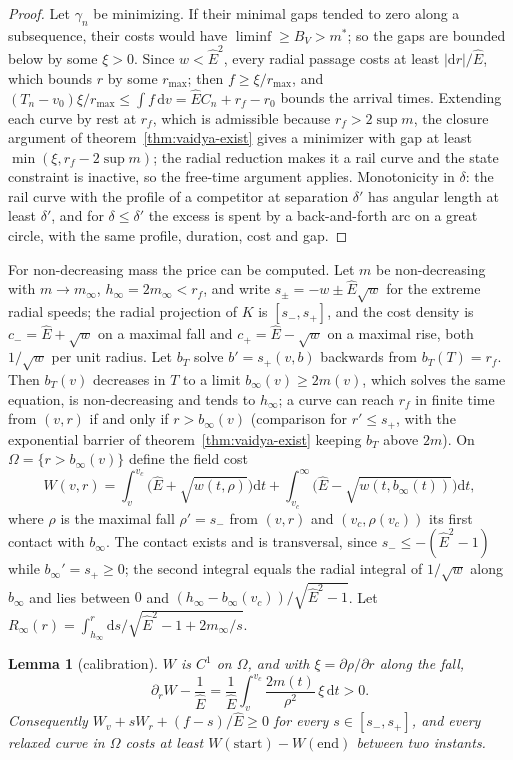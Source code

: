 \documentclass[aip,jmp,amsmath,amssymb,reprint]{revtex4-2}
\newcommand{\Ehat}{\hat E}
\newcommand{\dd}{\mathrm{d}}
\theoremstyle{plain}
\newtheorem{lemma}[proposition]{Lemma}
\theoremstyle{definition}
\begin{document}
\begin{proof}
Let $\gamma_n$ be minimizing. If their minimal gaps tended to zero along a subsequence, their
costs would have $\liminf\ge B_V>m^*$; so the gaps are bounded below by some $\xi>0$. Since
$w<\Ehat^2$, every radial passage costs at least $|\dd r|/\Ehat$, which bounds $r$ by some $r_{\max}$;
then $f\ge\xi/r_{\max}$, and $(T_n-v_0)\xi/r_{\max}\le\int f\,\dd v=\Ehat C_n+r_f-r_0$ bounds the
arrival times. Extending each curve by rest at $r_f$, which is admissible because
$r_f>2\sup m$, the closure argument of theorem~\ref{thm:vaidya-exist} gives a minimizer with gap at
least $\min(\xi,r_f-2\sup m)$; the radial reduction makes it a rail curve and the state
constraint is inactive, so the free-time argument applies. Monotonicity in $\delta$: the
rail curve with the profile of a competitor at separation $\delta'$ has angular length at least
$\delta'$, and for $\delta\le\delta'$ the excess is spent by a back-and-forth arc on a great circle,
with the same profile, duration, cost and gap.
\end{proof}

For non-decreasing mass the price can be computed. Let $m$ be non-decreasing with
$m\to m_\infty$, $h_\infty=2m_\infty<r_f$, and write $s_\pm=-w\pm\Ehat\sqrt w$ for the extreme radial
speeds; the radial projection of $K$ is $[s_-,s_+]$, and the cost density is
$c_-=\Ehat+\sqrt w$ on a maximal fall and $c_+=\Ehat-\sqrt w$ on a maximal rise, both $1/\sqrt w$ per unit
radius. Let $b_T$ solve $b'=s_+(v,b)$ backwards from $b_T(T)=r_f$. Then $b_T(v)$ decreases in $T$ to
a limit $b_\infty(v)\ge2m(v)$, which solves the same equation, is non-decreasing and tends to
$h_\infty$; a curve can reach $r_f$ in finite time from $(v,r)$ if and only if $r>b_\infty(v)$
(comparison for $r'\le s_+$, with the exponential barrier of theorem~\ref{thm:vaidya-exist} keeping
$b_T$ above $2m$). On $\Omega=\{r>b_\infty(v)\}$ define the field cost
\[
  W(v,r)=\int_v^{v_c}\big(\Ehat+\sqrt{w(t,\rho)}\big)\dd t+\int_{v_c}^\infty\big(\Ehat-\sqrt{w(t,b_\infty(t))}\big)\dd t,
\]
where $\rho$ is the maximal fall $\rho'=s_-$ from $(v,r)$ and $(v_c,\rho(v_c))$ its first contact with
$b_\infty$. The contact exists and is transversal, since $s_-\le-(\Ehat^2-1)$ while $b_\infty'=s_+\ge0$;
the second integral equals the radial integral of $1/\sqrt w$ along $b_\infty$ and lies between
$0$ and $(h_\infty-b_\infty(v_c))/\sqrt{\Ehat^2-1}$. Let $R_\infty(r)=\int_{h_\infty}^r\dd s/\sqrt{\Ehat^2-1+2m_\infty/s}$.

\begin{lemma}[calibration]\label{lem:vaidya-calib}
$W$ is $C^1$ on $\Omega$, and with $\xi=\partial\rho/\partial r$ along the fall,
\[
  \partial_rW-\frac1\Ehat=\frac1\Ehat\int_v^{v_c}\frac{2m(t)}{\rho^2}\,\xi\,\dd t>0 .
\]
Consequently $W_v+sW_r+(f-s)/\Ehat\ge0$ for every $s\in[s_-,s_+]$, and every relaxed curve in $\Omega$
costs at least $W(\text{start})-W(\text{end})$ between two instants.
\end{lemma}
\end{document}
